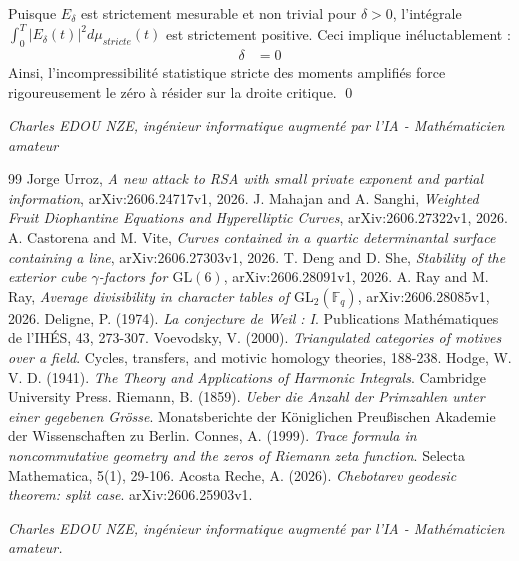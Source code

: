 \documentclass[
]{article}
\begin{document}
Puisque $E_\delta$ est strictement mesurable et non trivial pour $\delta > 0$, l'intégrale $\int_0^T \left| E_\delta(t) \right|^2 d\mu_{stricte}(t)$ est strictement positive. Ceci implique inéluctablement :
\begin{align*}
    \delta &= 0
\end{align*}
Ainsi, l'incompressibilité statistique stricte des moments amplifiés force rigoureusement le zéro à résider sur la droite critique. \qed

\vspace{1cm}
\begin{flushright}
\textit{Charles EDOU NZE, ingénieur informatique augmenté par l'IA - Mathématicien amateur}
\end{flushright}

\begin{thebibliography}{99}
 Jorge Urroz, \textit{A new attack to RSA with small private exponent and partial information}, arXiv:2606.24717v1, 2026.
 J. Mahajan and A. Sanghi, \textit{Weighted Fruit Diophantine Equations and Hyperelliptic Curves}, arXiv:2606.27322v1, 2026.
 A. Castorena and M. Vite, \textit{Curves contained in a quartic determinantal surface containing a line}, arXiv:2606.27303v1, 2026.
 T. Deng and D. She, \textit{Stability of the exterior cube $\gamma$-factors for $\mathrm{GL}(6)$}, arXiv:2606.28091v1, 2026.
 A. Ray and M. Ray, \textit{Average divisibility in character tables of $\mathrm{GL}_2(\mathbb{F}_q)$}, arXiv:2606.28085v1, 2026.
 Deligne, P. (1974). \textit{La conjecture de Weil : I}. Publications Mathématiques de l'IHÉS, 43, 273-307.
 Voevodsky, V. (2000). \textit{Triangulated categories of motives over a field}. Cycles, transfers, and motivic homology theories, 188-238.
 Hodge, W. V. D. (1941). \textit{The Theory and Applications of Harmonic Integrals}. Cambridge University Press.
 Riemann, B. (1859). \textit{Ueber die Anzahl der Primzahlen unter einer gegebenen Grösse}. Monatsberichte der Königlichen Preußischen Akademie der Wissenschaften zu Berlin.
 Connes, A. (1999). \textit{Trace formula in noncommutative geometry and the zeros of Riemann zeta function}. Selecta Mathematica, 5(1), 29-106.
 Acosta Reche, A. (2026). \textit{Chebotarev geodesic theorem: split case}. arXiv:2606.25903v1.
\end{thebibliography}

\vspace{1cm}
\begin{flushright}
\textit{Charles EDOU NZE, ingénieur informatique augmenté par l'IA - Mathématicien amateur.}
\end{flushright}
\end{document}
